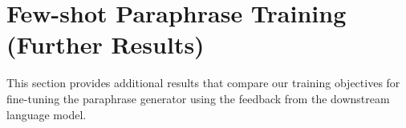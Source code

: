 \documentclass[11pt]{article}
\begin{document}

\appendix

\section{Few-shot Paraphrase Training (Further Results)}
\label{training-paraphrase-extra:appendix}


This section provides additional results that compare our training objectives for fine-tuning the paraphrase generator using the feedback from the downstream language model. 
\end{document}
